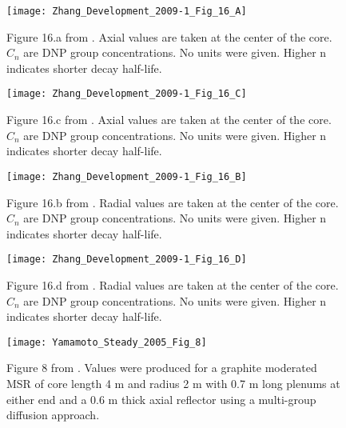 \documentclass[review]{elsarticle}
\begin{document}
\begin{figure}[h]
   \centering
   \texttt{[image: Zhang\_Development\_2009-1\_Fig\_16\_A]}
   \caption{Figure 16.a from \cite{zhang_development_2009-1}. 
               Axial
               values are taken at the center of the core. $C_{n}$ are DNP
               group concentrations. No units were given. Higher n indicates
               shorter decay half-life.}
   \label{fig:zhang_axial_velocity_dnp_1}
\end{figure}

\begin{figure}[h]
   \centering
   \texttt{[image: Zhang\_Development\_2009-1\_Fig\_16\_C]}
   \caption{Figure 16.c from \cite{zhang_development_2009-1}. 
               Axial
               values are taken at the center of the core. $C_{n}$ are DNP
               group concentrations. No units were given. Higher n indicates
               shorter decay half-life.}
   \label{fig:zhang_axial_velocity_dnp_2}
\end{figure}

\begin{figure}[h]
   \centering
   \texttt{[image: Zhang\_Development\_2009-1\_Fig\_16\_B]}
   \caption{Figure 16.b from \cite{zhang_development_2009-1}. 
               Radial 
               values are taken at the center of the core. $C_{n}$ are DNP
               group concentrations. No units were given. Higher n indicates
               shorter decay half-life.}
   \label{fig:zhang_radial_velocity_dnp_1}
\end{figure}

\begin{figure}[h]
   \centering
   \texttt{[image: Zhang\_Development\_2009-1\_Fig\_16\_D]}
   \caption{Figure 16.d from \cite{zhang_development_2009-1}. 
               Radial
               values are taken at the center of the core. $C_{n}$ are DNP
               group concentrations. No units were given. Higher n indicates
               shorter decay half-life.}
   \label{fig:zhang_radial_velocity_dnp_2}
\end{figure}

\begin{figure}[h]
   \centering
   \texttt{[image: Yamamoto\_Steady\_2005\_Fig\_8]}
   \caption{Figure 8 from \cite{yamamoto_steady_2005}. Values were produced for
    a graphite moderated MSR of core length 4 m and radius 2 m with 0.7 m long 
    plenums at either end and a 0.6 m thick axial reflector using a
    multi-group diffusion approach.}
   \label{fig:yamamoto_transit_time}
\end{figure}
\end{document}
